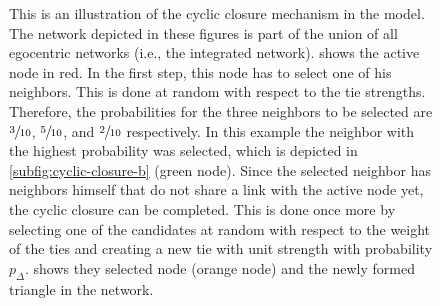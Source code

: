 \begin{figure}
    \caption[Cyclic closure mechanism example]{This is an illustration of the cyclic closure mechanism in the model. The network depicted in these figures is part of the union of all egocentric networks (i.e., the integrated network).  shows the active node in red. In the first step, this node has to select one of his neighbors. This is done at random with respect to the tie strengths. Therefore, the probabilities for the three neighbors to be selected are \(\sfrac{3}{10}\), \(\sfrac{5}{10}\), and \(\sfrac{2}{10}\) respectively. In this example the neighbor with the highest probability was selected, which is depicted in \cref{subfig:cyclic-closure-b} (green node). Since the selected neighbor has neighbors himself that do not share a link with the active node yet, the cyclic closure can be completed. This is done once more by selecting one of the candidates at random with respect to the weight of the ties and creating a new tie with unit strength with probability \( p_{\Delta} \).  shows they selected node (orange node) and the newly formed triangle in the network.}
    \label{fig:cyclic-closure}
\end{figure}


